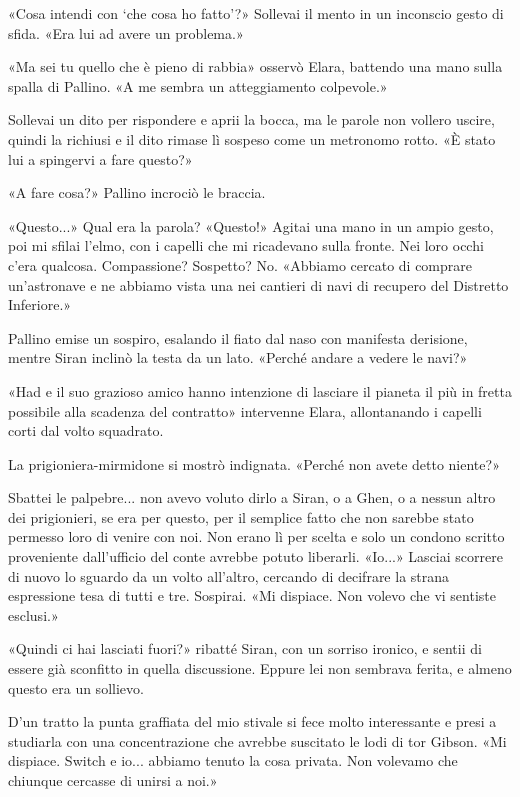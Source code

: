 «Cosa intendi con `che cosa ho fatto'?» Sollevai il mento in un
inconscio gesto di sfida. «Era lui ad avere un problema.»

«Ma sei tu quello che è pieno di rabbia» osservò Elara, battendo una
mano sulla spalla di Pallino. «A me sembra un atteggiamento colpevole.»

Sollevai un dito per rispondere e aprii la bocca, ma le parole non
vollero uscire, quindi la richiusi e il dito rimase lì sospeso come un
metronomo rotto. «È stato lui a spingervi a fare questo?»

«A fare cosa?» Pallino incrociò le braccia.

«Questo...» Qual era la parola? «Questo!» Agitai una mano in un ampio
gesto, poi mi sfilai l'elmo, con i capelli che mi ricadevano sulla
fronte. Nei loro occhi c'era qualcosa. Compassione? Sospetto? No.
«Abbiamo cercato di comprare un'astronave e ne abbiamo vista una nei
cantieri di navi di recupero del Distretto Inferiore.»

Pallino emise un sospiro, esalando il fiato dal naso con manifesta
derisione, mentre Siran inclinò la testa da un lato. «Perché andare a
vedere le navi?»

«Had e il suo grazioso amico hanno intenzione di lasciare il pianeta il
più in fretta possibile alla scadenza del contratto» intervenne Elara,
allontanando i capelli corti dal volto squadrato.

La prigioniera-mirmidone si mostrò indignata. «Perché non avete detto
niente?»

Sbattei le palpebre... non avevo voluto dirlo a Siran, o a Ghen, o a
nessun altro dei prigionieri, se era per questo, per il semplice fatto
che non sarebbe stato permesso loro di venire con noi. Non erano lì per
scelta e solo un condono scritto proveniente dall'ufficio del conte
avrebbe potuto liberarli. «Io...» Lasciai scorrere di nuovo lo sguardo
da un volto all'altro, cercando di decifrare la strana espressione tesa
di tutti e tre. Sospirai. «Mi dispiace. Non volevo che vi sentiste
esclusi.»

«Quindi ci hai lasciati fuori?» ribatté Siran, con un sorriso ironico, e
sentii di essere già sconfitto in quella discussione. Eppure lei non
sembrava ferita, e almeno questo era un sollievo.

D'un tratto la punta graffiata del mio stivale si fece molto
interessante e presi a studiarla con una concentrazione che avrebbe
suscitato le lodi di tor Gibson. «Mi dispiace. Switch e io... abbiamo
tenuto la cosa privata. Non volevamo che chiunque cercasse di unirsi a
noi.»

